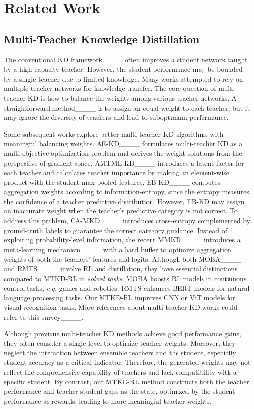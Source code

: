 \section{Related Work}
\subsection{Multi-Teacher Knowledge Distillation}
	The conventional KD framework____ often improves a student network taught by a high-capacity teacher. However, the student performance may be bounded by a single teacher due to limited knowledge. Many works attempted to rely on multiple teacher networks for knowledge transfer. The core question of multi-teacher KD is how to balance the weights among various teacher networks. A straightforward method____ is to assign an equal weight to each teacher, but it may ignore the diversity of teachers and lead to suboptimum performance. 
	
	Some subsequent works explore better multi-teacher KD algorithms with meaningful balancing weights.  AE-KD____ formulates multi-teacher KD as a multi-objective optimization problem and derives the weight solutions from the perspective of gradient space. AMTML-KD____ introduces a latent factor for each teacher and calculates teacher importance by making an element-wise product with the student max-pooled features. EB-KD____  computes aggregation weights according to information-entropy, since the entropy measures the confidence of a teacher predictive distribution. However,  EB-KD may assign an inaccurate weight when the teacher's predictive category is not correct. To address this problem, CA-MKD____ introduces cross-entropy complemented by ground-truth labels to guarantee the correct category guidance. Instead of exploiting probability-level information, the recent MMKD____ introduces a meta-learning mechanism____ with a hard buffer to optimize aggregation weights of both the teachers' features and logits. Although both MOBA____ and RMTS____ involve RL and distillation, they have essential distinctions compared to MTKD-RL in \emph{solved tasks}. MOBA boosts RL models in continuous control tasks, \emph{e.g.} games and robotics. RMTS enhances BERT models for natural language processing tasks. Our MTKD-RL improves CNN or ViT models for visual recognition tasks. More references about multi-teacher KD works could refer to this survey____. 
	
	Although previous multi-teacher KD methods achieve good performance gains, they often consider a single level to optimize teacher weights.  Moreover, they neglect the interaction between ensemble teachers and the student, especially student accuracy as a critical indicator. Therefore, the generated weights may not reflect the comprehensive capability of teachers and lack compatibility with a specific student. By contrast, our MTKD-RL method  constructs both the teacher performance and teacher-student gaps as the state, optimized by the student performance as rewards, leading to more meaningful teacher weights.
	
